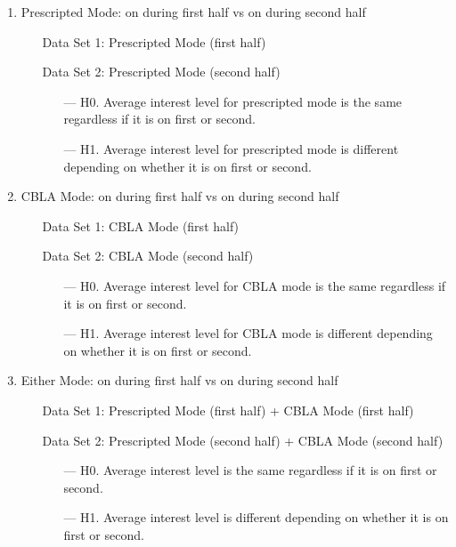 \begin{enumerate}
	\item Prescripted Mode: on during first half vs on during second half \label{itm:interest-wtest-first}
		\begin{itemize}[align=left]
			\item[Data Set 1: ] Prescripted Mode (first half)
			\item[Data Set 2: ] Prescripted Mode (second half)
			\begin{itemize}
				\item[--- H0.] Average interest level for prescripted mode is the same regardless if it is on first or second.
				\item[--- H1.] Average interest level for prescripted mode is different depending on whether it is on first or second.
			\end{itemize}
		\end{itemize}
	\item CBLA Mode: on during first half vs on during second half
		\begin{itemize}[align=left]
			\item[Data Set 1: ] CBLA Mode (first half)
			\item[Data Set 2: ] CBLA Mode (second half)
			\begin{itemize}
				\item[--- H0.] Average interest level for CBLA mode is the same regardless if it is on first or second.
				\item[--- H1.] Average interest level for CBLA mode is different depending on whether it is on first or second.			
			\end{itemize}
		\end{itemize}
	\item Either Mode: on during first half vs on during second half
		\begin{itemize}[align=left]
			\item[Data Set 1: ] Prescripted Mode (first half) + CBLA Mode (first half)
			\item[Data Set 2: ] Prescripted Mode (second half) + CBLA Mode (second half)
			\begin{itemize}
				\item[--- H0.] Average interest level is the same regardless if it is on first or second.
				\item[--- H1.] Average interest level is different depending on whether it is on first or second.
			\end{itemize}
		\end{itemize}

\end{enumerate}
